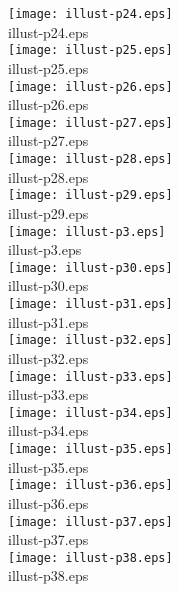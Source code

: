 \texttt{[image: illust-p24.eps]}\\illust-p24.eps\\


\texttt{[image: illust-p25.eps]}\\illust-p25.eps\\


\texttt{[image: illust-p26.eps]}\\illust-p26.eps\\


\texttt{[image: illust-p27.eps]}\\illust-p27.eps\\


\texttt{[image: illust-p28.eps]}\\illust-p28.eps\\


\texttt{[image: illust-p29.eps]}\\illust-p29.eps\\


\texttt{[image: illust-p3.eps]}\\illust-p3.eps\\


\texttt{[image: illust-p30.eps]}\\illust-p30.eps\\


\texttt{[image: illust-p31.eps]}\\illust-p31.eps\\


\texttt{[image: illust-p32.eps]}\\illust-p32.eps\\


\texttt{[image: illust-p33.eps]}\\illust-p33.eps\\


\texttt{[image: illust-p34.eps]}\\illust-p34.eps\\


\texttt{[image: illust-p35.eps]}\\illust-p35.eps\\


\texttt{[image: illust-p36.eps]}\\illust-p36.eps\\


\texttt{[image: illust-p37.eps]}\\illust-p37.eps\\


\texttt{[image: illust-p38.eps]}\\illust-p38.eps\\


